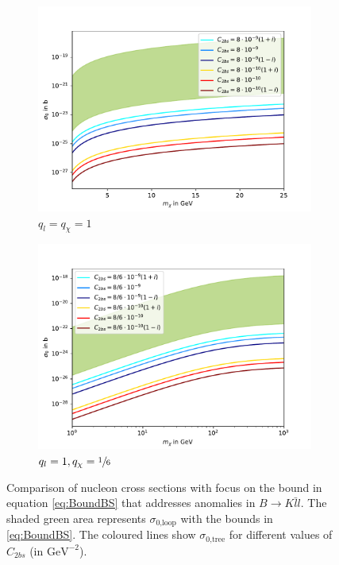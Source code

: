 \begin{figure}
	\centering
	\begin{subfigure}[]{0.8\textwidth}
		\includegraphics[width=\textwidth]{content/graphics/Allgemein11.pdf}
		\caption{$q_l=q_\chi=1$}
		\label{fig:Allg11}
	\end{subfigure}
	\begin{subfigure}[]{0.8\textwidth}
		\includegraphics[width=\textwidth]{content/graphics/Allgemein116.pdf}
		\caption{$q_l=1,q_\chi=\sfrac{1}{6}$}
		\label{fig:Allg116}
	\end{subfigure}
	\caption{Comparison of nucleon cross sections with focus on the bound in equation \eqref{eq:BoundBS} that addresses anomalies in $B\rightarrow K\bar{l}l$. The shaded green area represents $\sigma_\text{0,loop}$ with the bounds in \eqref{eq:BoundBS}. The coloured lines show $\sigma_\text{0,tree}$ for different values of $C_{2bs}$ (in $\si{\giga\electronvolt}^{-2}$).}
	\label{fig:Allgemein}
\end{figure}

